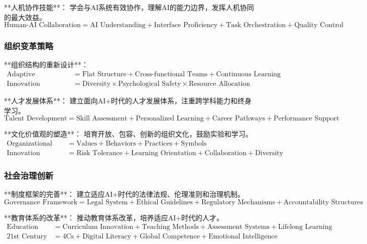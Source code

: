 **人机协作技能**：
学会与AI系统有效协作，理解AI的能力边界，发挥人机协同的最大效益。
\begin{equation}
\text{Human-AI Collaboration} = \text{AI Understanding} + \text{Interface Proficiency} + \text{Task Orchestration} + \text{Quality Control}
\end{equation}

\subsubsection{组织变革策略} %

**组织结构的重新设计**：
\begin{align}
\text{Adaptive Organization} &= \text{Flat Structure} + \text{Cross-functional Teams} + \text{Continuous Learning} \\
\text{Innovation Capacity} &= \text{Diversity} \times \text{Psychological Safety} \times \text{Resource Allocation}
\end{align}

**人才发展体系**：
建立面向AI+时代的人才发展体系，注重跨学科能力和终身学习。
\begin{equation}
\text{Talent Development} = \text{Skill Assessment} + \text{Personalized Learning} + \text{Career Pathways} + \text{Performance Support}
\end{equation}

**文化价值观的塑造**：
培育开放、包容、创新的组织文化，鼓励实验和学习。
\begin{align}
\text{Organizational Culture} &= \text{Values} + \text{Behaviors} + \text{Practices} + \text{Symbols} \\
\text{Innovation Culture} &= \text{Risk Tolerance} + \text{Learning Orientation} + \text{Collaboration} + \text{Diversity}
\end{align}

\subsubsection{社会治理创新} %

**制度框架的完善**：
建立适应AI+时代的法律法规、伦理准则和治理机制。
\begin{equation}
\text{Governance Framework} = \text{Legal System} + \text{Ethical Guidelines} + \text{Regulatory Mechanisms} + \text{Accountability Structures}
\end{equation}

**教育体系的改革**：
推动教育体系改革，培养适应AI+时代的人才。
\begin{align}
\text{Education Reform} &= \text{Curriculum Innovation} + \text{Teaching Methods} + \text{Assessment Systems} + \text{Lifelong Learning} \\
\text{21st Century Skills} &= \text{4Cs} + \text{Digital Literacy} + \text{Global Competence} + \text{Emotional Intelligence}
\end{align}

